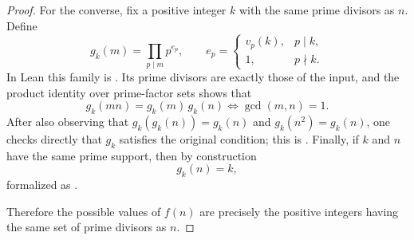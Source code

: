 \begin{proof}
For the converse, fix a positive integer \(k\) with the same prime divisors as
\(n\). Define
\[
  g_k(m)=\prod_{p\mid m} p^{e_p},
  \qquad
  e_p=
  \begin{cases}
    v_p(k), & p\mid k,\\
    1, & p\nmid k.
  \end{cases}
\]
In Lean this family is
. Its prime divisors are
exactly those of the input, and the product identity over prime-factor sets
shows that
\[
  g_k(mn)=g_k(m)\,g_k(n)
  \iff \gcd(m,n)=1.
\]
After also observing that \(g_k(g_k(n))=g_k(n)\) and \(g_k(n^2)=g_k(n)\), one
checks directly that \(g_k\) satisfies the original condition; this is
. Finally, if
\(k\) and \(n\) have the same prime support, then by construction
\[
  g_k(n)=k,
\]
formalized as
.

Therefore the possible values of \(f(n)\) are precisely the positive integers
having the same set of prime divisors as \(n\).
\end{proof}
